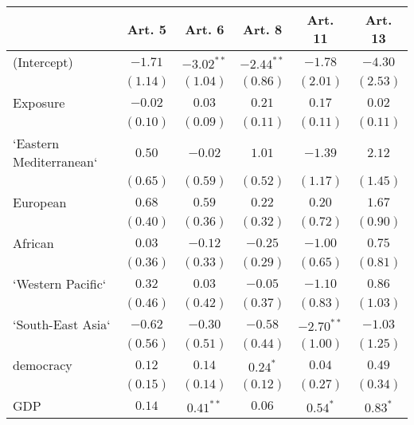 
\begin{table}[!h]
\begin{center}
\begin{tabular}{l c c c c c }
\toprule
 & Art. 5 & Art. 6 & Art. 8 & Art. 11 & Art. 13 \\
\midrule
(Intercept)             & $-1.71$      & $-3.02^{**}$ & $-2.44^{**}$ & $-1.78$      & $-4.30$      \\
                        & $(1.14)$     & $(1.04)$     & $(0.86)$     & $(2.01)$     & $(2.53)$     \\
Exposure                & $-0.02$      & $0.03$       & $0.21$       & $0.17$       & $0.02$       \\
                        & $(0.10)$     & $(0.09)$     & $(0.11)$     & $(0.11)$     & $(0.11)$     \\
`Eastern Mediterranean` & $0.50$       & $-0.02$      & $1.01$       & $-1.39$      & $2.12$       \\
                        & $(0.65)$     & $(0.59)$     & $(0.52)$     & $(1.17)$     & $(1.45)$     \\
European                & $0.68$       & $0.59$       & $0.22$       & $0.20$       & $1.67$       \\
                        & $(0.40)$     & $(0.36)$     & $(0.32)$     & $(0.72)$     & $(0.90)$     \\
African                 & $0.03$       & $-0.12$      & $-0.25$      & $-1.00$      & $0.75$       \\
                        & $(0.36)$     & $(0.33)$     & $(0.29)$     & $(0.65)$     & $(0.81)$     \\
`Western Pacific`       & $0.32$       & $0.03$       & $-0.05$      & $-1.10$      & $0.86$       \\
                        & $(0.46)$     & $(0.42)$     & $(0.37)$     & $(0.83)$     & $(1.03)$     \\
`South-East Asia`       & $-0.62$      & $-0.30$      & $-0.58$      & $-2.70^{**}$ & $-1.03$      \\
                        & $(0.56)$     & $(0.51)$     & $(0.44)$     & $(1.00)$     & $(1.25)$     \\
democracy               & $0.12$       & $0.14$       & $0.24^{*}$   & $0.04$       & $0.49$       \\
                        & $(0.15)$     & $(0.14)$     & $(0.12)$     & $(0.27)$     & $(0.34)$     \\
GDP                     & $0.14$       & $0.41^{**}$  & $0.06$       & $0.54^{*}$   & $0.83^{*}$   \\

\end{tabular}
\end{center}
\end{table}
